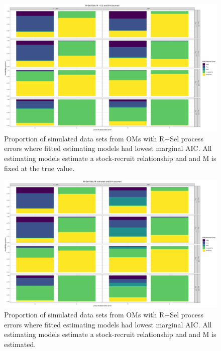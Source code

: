 \documentclass[
  12pt,
]{article}
\begin{document}
\begin{landscape}
\begin{figure}
\caption{Proportion of simulated data sets from OMs with R+Sel process errors where fitted estimating models had lowest marginal AIC. All estimating models estimate a stock-recruit relationship and and M is fixed at the true value.} \label{Sel_om_proportion_best_aic_SR_MF}
\begin{center}
\includegraphics[width = \textwidth]{Sel_om_proportion_best_aic_SR_MF.png}
\end{center}
\end{figure}
\end{landscape}

\begin{landscape}
\begin{figure}
\caption{Proportion of simulated data sets from OMs with R+Sel process errors where fitted estimating models had lowest marginal AIC. All estimating models estimate a stock-recruit relationship and and M is estimated.} \label{Sel_om_proportion_best_aic_SR_ME}
\begin{center}
\includegraphics[width = \textwidth]{Sel_om_proportion_best_aic_SR_ME.png}
\end{center}
\end{figure}
\end{landscape}
\end{document}
